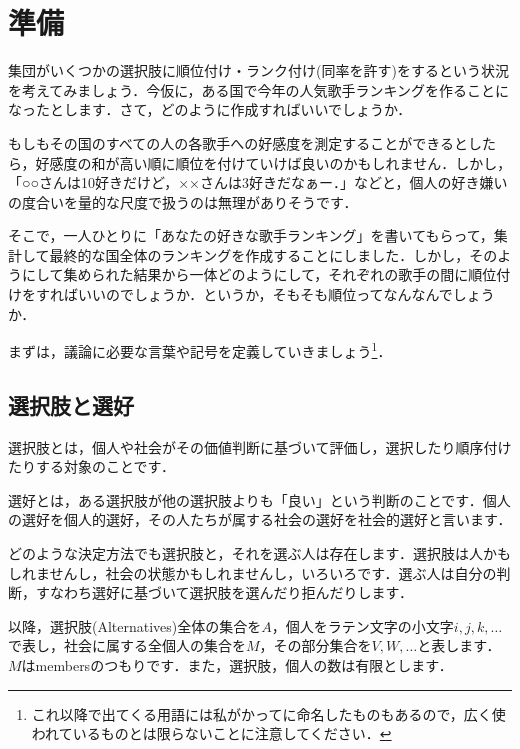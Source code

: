 \section{準備}
集団がいくつかの選択肢に順位付け・ランク付け(同率を許す)をするという状況を考えてみましょう．今仮に，ある国で今年の人気歌手ランキングを作ることになったとします．さて，どのように作成すればいいでしょうか．

もしもその国のすべての人の各歌手への好感度を測定することができるとしたら，好感度の和が高い順に順位を付けていけば良いのかもしれません．しかし，「○○さんは10好きだけど，××さんは3好きだなぁー．」などと，個人の好き嫌いの度合いを量的な尺度で扱うのは無理がありそうです．

そこで，一人ひとりに「あなたの好きな歌手ランキング」を書いてもらって，集計して最終的な国全体のランキングを作成することにしました．しかし，そのようにして集められた結果から一体どのようにして，それぞれの歌手の間に順位付けをすればいいのでしょうか．というか，そもそも順位ってなんなんでしょうか．

まずは，議論に必要な言葉や記号を定義していきましょう\footnote{これ以降で出てくる用語には私がかってに命名したものもあるので，広く使われているものとは限らないことに注意してください．}．

\subsection{選択肢と選好}
\begin{dfn}
    選択肢とは，個人や社会がその価値判断に基づいて評価し，選択したり順序付けたりする対象のことです．
\end{dfn}
\begin{dfn}
    選好とは，ある選択肢が他の選択肢よりも「良い」という判断のことです．個人の選好を個人的選好，その人たちが属する社会の選好を社会的選好と言います．
\end{dfn}

どのような決定方法でも選択肢と，それを選ぶ人は存在します．選択肢は人かもしれませんし，社会の状態かもしれませんし，いろいろです．選ぶ人は自分の判断，すなわち選好に基づいて選択肢を選んだり拒んだりします．

以降，選択肢(Alternatives)全体の集合を$A$，個人をラテン文字の小文字$i,j,k,\dots$で表し，社会に属する全個人の集合を$M$，その部分集合を$V,W,\dots$と表します．$M$はmembersのつもりです．また，選択肢，個人の数は有限とします．

